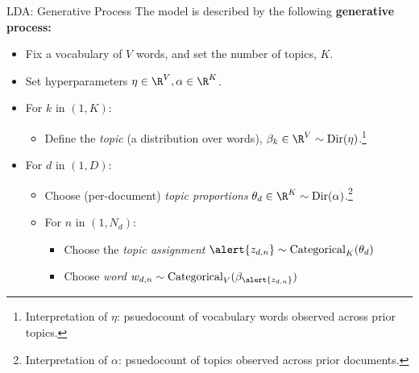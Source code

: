 \documentclass[10pt]{beamer}
\begin{document}
\begin{frame}{LDA: Generative Process}
\footnotesize
The model is described by the following \bf{generative process}:
\pause 
\begin{itemize}
\item Fix a vocabulary of $V$ words, and set the number of topics,  $K$.  \pause 
\item Set hyperparameters $\eta \in \R^V, \alpha \in \R^K$. \pause 
\item For $k$ in $(1,K)$:
	\begin{itemize}
	\item Define the \textit{topic} \tiny (a distribution over words),  \footnotesize $\beta_k \in \R^V \sim \text{Dir}(\eta)$.\footnote{\tiny Interpretation of $\eta$: psuedocount of vocabulary words observed across prior topics.} \pause 
	\end{itemize}
\item For $d$ in $(1,D):$
	\begin{itemize}
	\item Choose  \tiny (per-document)  \footnotesize \textit{topic proportions}   $\theta_d \in \R^K \sim \text{Dir}(\alpha)$.\footnote{\tiny Interpretation of $\alpha$: psuedocount of topics observed across prior documents.} \pause 
	\item For $n$ in $(1, N_d)$:
		\begin{itemize}
		\item Choose the \textit{topic assignment} $\alert{z_{d,n}} \sim \text{Categorical}_K (\theta_d)$ \pause
		\item Choose \textit{word} $w_{d,n} \sim \text{Categorical}_V(\beta_{\alert{z_{d,n}}})$
		\end{itemize}
	\end{itemize}
\end{itemize}
\end{frame}
\end{document}
